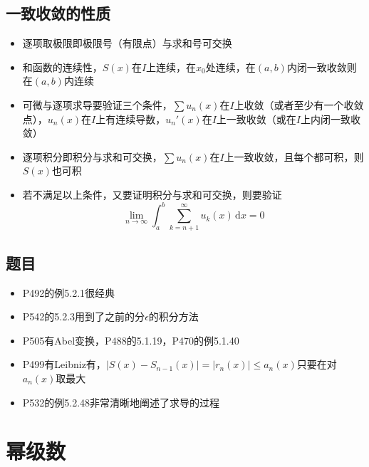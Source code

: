 \documentclass[UTF8]{ctexart}
\newcommand{\ud}{\,\mathrm{d}}
\begin{document}
\subsection{一致收敛的性质}
\begin{itemize}
\item 逐项取极限即极限号（有限点）与求和号可交换
\item 和函数的连续性，$S(x)$在$I$上连续，在$x_0$处连续，在$(a,b)$内闭一致收敛则在$(a,b)$内连续
\item 可微与逐项求导要验证三个条件，$\sum u_n(x)$在$I$上收敛（或者至少有一个收敛点），$u_n(x)$在$I$上有连续导数，$u_n'(x)$在$I$上一致收敛（或在$I$上内闭一致收敛）
\item 逐项积分即积分与求和可交换，$\sum u_n(x)$在$I$上一致收敛，且每个都可积，则$S(x)$也可积
\item 若不满足以上条件，又要证明积分与求和可交换，则要验证
\[
\lim_{n\to\infty}\int_a^b \sum_{k=n+1}^\infty u_k(x)\ud x=0
\]
\end{itemize}
\subsection{题目}
\begin{itemize}
\item P492的例5.2.1很经典

\item P542的5.2.3用到了之前的分$\epsilon$的积分方法

\item P505有Abel变换，P488的5.1.19，P470的例5.1.40

\item P499有Leibniz有，$|S(x)-S_{n-1}(x)|=|r_n(x)| \leq a_{n}(x)$只要在对$a_{n}(x)$取最大

\item P532的例5.2.48非常清晰地阐述了求导的过程
\end{itemize}

\section{幂级数}
\end{document}
